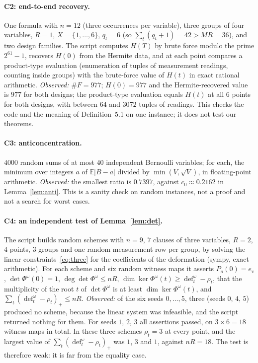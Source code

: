 \documentclass[11pt,a4paper]{article}
\theoremstyle{definition}
\theoremstyle{remark}
\newcommand{\E}{\mathbb{E}}
\newcommand{\dfc}{\operatorname{def}}
\begin{document}
\paragraph{C2: end-to-end recovery.} One formula with $n=12$ (three occurrences per
variable), three groups of four variables, $R=1$, $X=\{1,\dots,6\}$, $q_t=6$ (so
$\sum_t(q_t+1)=42>MR=36$), and two design families. The script computes $H(T)$ by brute
force modulo the prime $2^{61}-1$, recovers $H(0)$ from the Hermite data, and at each point
compares a product-type evaluation (enumeration of tuples of measurement readings, counting
inside groups) with the brute-force value of $H(t)$ in exact rational arithmetic.
\emph{Observed:} $\#F=977$; $H(0)=977$ and the Hermite-recovered value is $977$ for both
designs; the product-type evaluation equals $H(t)$ at all $6$ points for both designs, with
between $64$ and $3072$ tuples of readings. This checks the code and the meaning of
Definition~5.1 on one instance; it does not test our theorems.

\paragraph{C3: anticoncentration.} $4000$ random sums of at most $40$ independent Bernoulli
variables; for each, the minimum over integers $a$ of $\E|B-a|$ divided by
$\min(V,\sqrt V)$, in floating-point arithmetic. \emph{Observed:} the smallest ratio is
$0.7397$, against $c_0\approx0.2162$ in Lemma~\ref{lem:anti}. This is a sanity check on
random instances, not a proof and not a search for worst cases.

\paragraph{C4: an independent test of Lemma~\ref{lem:det}.} The script builds random schemes
with $n=9$, $7$ clauses of three variables, $R=2$, $4$ points, $3$ groups and one random
measurement row per group, by solving the linear constraints~\eqref{eq:three} for the
coefficients of the deformation (sympy, exact arithmetic). For each scheme and six random
witness maps it asserts $P_o(0)=e_v$, $\det\Phi^\omega(0)=1$, $\deg\det\Phi^\omega\le nR$,
$\dim\ker\Phi^\omega(t)\ge\dfc^\omega_t-\rho_t$, that the multiplicity of the root $t$ of
$\det\Phi^\omega$ is at least $\dim\ker\Phi^\omega(t)$, and
$\sum_t(\dfc^\omega_t-\rho_t)_+\le nR$. \emph{Observed:} of the six seeds $0,\dots,5$, three
(seeds $0$, $4$, $5$) produced no scheme, because the linear system was infeasible, and the
script returned nothing for them. For seeds $1$, $2$, $3$ all assertions passed, on
$3\times6=18$ witness maps in total. In these three schemes $\rho_t=3$ at every point, and
the largest value of $\sum_t(\dfc^\omega_t-\rho_t)_+$ was $1$, $3$ and $1$, against $nR=18$.
The test is therefore weak: it is far from the equality case.
\end{document}
